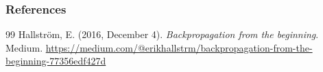 \begin{vbframe}
\frametitle{References}
\footnotesize{
\begin{thebibliography}{99}
Hallström, E. (2016, December 4). \textit{Backpropagation from the beginning}. Medium. \url{https://medium.com/@erikhallstrm/backpropagation-from-the-beginning-77356edf427d} 
\end{thebibliography}
}
\end{vbframe}


\endlecture

